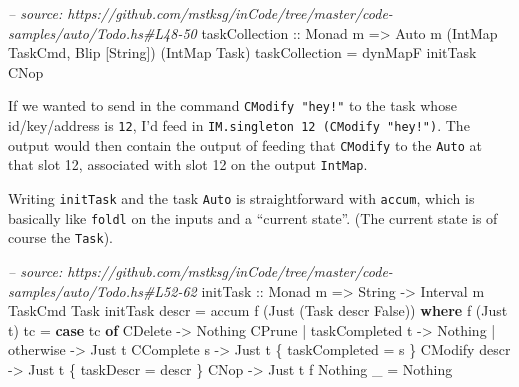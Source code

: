 \documentclass[]{article}
\newenvironment{Shaded}{}{}
\newcommand{\KeywordTok}[1]{\textcolor[rgb]{0.00,0.44,0.13}{\textbf{{#1}}}}
\newcommand{\DataTypeTok}[1]{\textcolor[rgb]{0.56,0.13,0.00}{{#1}}}
\newcommand{\CommentTok}[1]{\textcolor[rgb]{0.38,0.63,0.69}{\textit{{#1}}}}
\newcommand{\OtherTok}[1]{\textcolor[rgb]{0.00,0.44,0.13}{{#1}}}
\newcommand{\FunctionTok}[1]{\textcolor[rgb]{0.02,0.16,0.49}{{#1}}}
\newcommand{\NormalTok}[1]{{#1}}
\begin{document}
\begin{Shaded}
\begin{Highlighting}[]
\CommentTok{-- source: https://github.com/mstksg/inCode/tree/master/code-samples/auto/Todo.hs#L48-50}
\OtherTok{taskCollection ::} \DataTypeTok{Monad} \NormalTok{m}
               \OtherTok{=>} \DataTypeTok{Auto} \NormalTok{m (}\DataTypeTok{IntMap} \DataTypeTok{TaskCmd}\NormalTok{, }\DataTypeTok{Blip} \NormalTok{[}\DataTypeTok{String}\NormalTok{]) (}\DataTypeTok{IntMap} \DataTypeTok{Task}\NormalTok{)}
\NormalTok{taskCollection }\FunctionTok{=} \NormalTok{dynMapF initTask }\DataTypeTok{CNop}
\end{Highlighting}
\end{Shaded}

If we wanted to send in the command \texttt{CModify\ "hey!"} to the task whose
id/key/address is \texttt{12}, I'd feed in
\texttt{IM.singleton\ 12\ (CModify\ "hey!")}. The output would then contain the
output of feeding that \texttt{CModify} to the \texttt{Auto} at that slot 12,
associated with slot 12 on the output \texttt{IntMap}.

Writing \texttt{initTask} and the task \texttt{Auto} is straightforward with
\texttt{accum}, which is basically like \texttt{foldl} on the inputs and a
``current state''. (The current state is of course the \texttt{Task}).

\begin{Shaded}
\begin{Highlighting}[]
\CommentTok{-- source: https://github.com/mstksg/inCode/tree/master/code-samples/auto/Todo.hs#L52-62}
\OtherTok{initTask ::} \DataTypeTok{Monad} \NormalTok{m }\OtherTok{=>} \DataTypeTok{String} \OtherTok{->} \DataTypeTok{Interval} \NormalTok{m }\DataTypeTok{TaskCmd} \DataTypeTok{Task}
\NormalTok{initTask descr }\FunctionTok{=} \NormalTok{accum f (}\DataTypeTok{Just} \NormalTok{(}\DataTypeTok{Task} \NormalTok{descr }\DataTypeTok{False}\NormalTok{))}
  \KeywordTok{where}
    \NormalTok{f (}\DataTypeTok{Just} \NormalTok{t) tc }\FunctionTok{=} \KeywordTok{case} \NormalTok{tc }\KeywordTok{of}
                      \DataTypeTok{CDelete}                  \OtherTok{->} \DataTypeTok{Nothing}
                      \DataTypeTok{CPrune} \FunctionTok{|} \NormalTok{taskCompleted t }\OtherTok{->} \DataTypeTok{Nothing}
                             \FunctionTok{|} \NormalTok{otherwise       }\OtherTok{->} \DataTypeTok{Just} \NormalTok{t}
                      \DataTypeTok{CComplete} \NormalTok{s              }\OtherTok{->} \DataTypeTok{Just} \NormalTok{t \{ taskCompleted }\FunctionTok{=} \NormalTok{s \}}
                      \DataTypeTok{CModify} \NormalTok{descr            }\OtherTok{->} \DataTypeTok{Just} \NormalTok{t \{ taskDescr }\FunctionTok{=} \NormalTok{descr \}}
                      \DataTypeTok{CNop}                     \OtherTok{->} \DataTypeTok{Just} \NormalTok{t}
    \NormalTok{f }\DataTypeTok{Nothing} \NormalTok{_   }\FunctionTok{=} \DataTypeTok{Nothing}
\end{Highlighting}
\end{Shaded}
\end{document}
